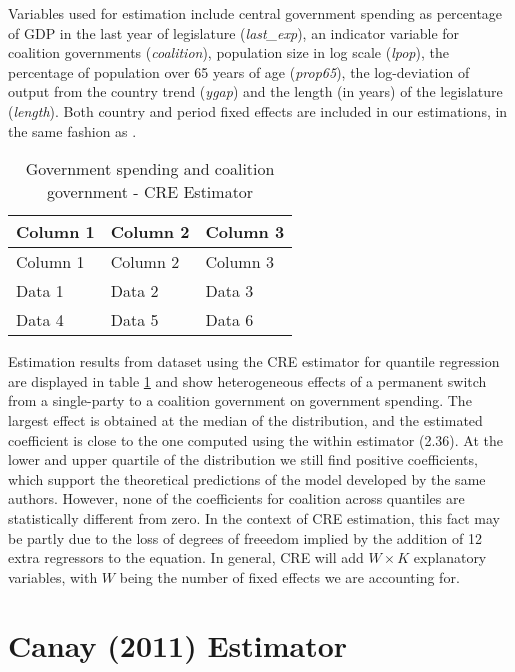 \documentclass[bib]{statapress}
\begin{document}
Variables used for estimation include central government spending as
percentage of GDP in the last year of legislature (\emph{last\_exp}), an
indicator variable for coalition governments (\emph{coalition}),
population size in log scale (\emph{lpop}), the percentage of population
over 65 years of age (\emph{prop65}), the log-deviation of output from
the country trend (\emph{ygap}) and the length (in years) of the
legislature (\emph{length}). Both country and period fixed effects are
included in our estimations, in the same fashion as \citep{persson2007}.

\label{tab:cre_results}
\begin{longtable}[]{@{}lll@{}}
\caption{Government spending and coalition government - CRE
Estimator}\tabularnewline
\toprule\noalign{}
Column 1 & Column 2 & Column 3 \\
\midrule\noalign{}
\endfirsthead
\toprule\noalign{}
Column 1 & Column 2 & Column 3 \\
\midrule\noalign{}
\endhead
\bottomrule\noalign{}
\endlastfoot
Data 1 & Data 2 & Data 3 \\
Data 4 & Data 5 & Data 6 \\
\end{longtable}

\label{tab:cre_results}{}

Estimation results from \citep{persson2007} dataset using the CRE
estimator for quantile regression are displayed in table
\hyperref[tab:cre_results]{1} and show heterogeneous effects of a
permanent switch from a single-party to a coalition government on
government spending. The largest effect is obtained at the median of the
distribution, and the estimated coefficient is close to the one
\citep{persson2007} computed using the within estimator (2.36). At the
lower and upper quartile of the distribution we still find positive
coefficients, which support the theoretical predictions of the model
developed by the same authors. However, none of the coefficients for
coalition across quantiles are statistically different from zero. In the
context of CRE estimation, this fact may be partly due to the loss of
degrees of freeedom implied by the addition of 12 extra regressors to
the equation. In general, CRE will add \(W \times K\) explanatory
variables, with \(W\) being the number of fixed effects we are
accounting for.

\section{Canay (2011) Estimator}\label{sec:canay}
\end{document}
